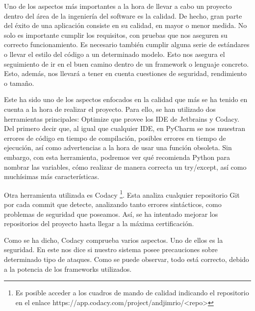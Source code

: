 Uno de los aspectos más importantes a la hora de llevar a cabo un proyecto dentro del área de la ingeniería del software es la calidad. De hecho, gran parte del éxito de una aplicación consiste en su calidad, en mayor o menor medida. No solo es importante cumplir los requisitos, con pruebas que nos aseguren su correcto funcionamiento. Es necesario también cumplir alguna serie de estándares o llevar el estilo del código a un determinado modelo. Esto nos asegura el seguimiento de ir en el buen camino dentro de un framework o lenguaje concreto. Esto, además, nos llevará a tener en cuenta cuestiones de seguridad, rendimiento o tamaño.

Este ha sido uno de los aspectos enfocados en la calidad que más se ha tenido en cuenta a la hora de realizar el proyecto. Para ello, se han utilizado dos herramientas principales: Optimize que provee los IDE de Jetbrains y Codacy. Del primero decir que, al igual que cualquier IDE, en PyCharm se nos muestran errores de código en tiempo de compilación, posibles errores en tiempo de ejecución, así como advertencias a la hora de usar una función obsoleta. Sin embargo, con esta herramienta, podremos ver qué recomienda Python para nombrar las variables, cómo realizar de manera correcta un try/except, así como muchísimas más características.

Otra herramienta utilizada es Codacy \footnote{Es posible acceder a los cuadros de mando de calidad indicando el repositorio en el enlace https://app.codacy.com/project/andjimrio/<repo>}. Esta analiza cualquier repositorio Git por cada commit que detecte, analizando tanto errores sintácticos, como problemas de seguridad que poseamos. Así, se ha intentado mejorar los repositorios del proyecto hasta llegar a la máxima certificación.


Como se ha dicho, Codacy comprueba varios aspectos. Uno de ellos es la seguridad. En este nos dice si nuestro sistema posee precauciones sobre determinado tipo de ataques. Como se puede observar, todo está correcto, debido a la potencia de los frameworks utilizados.

